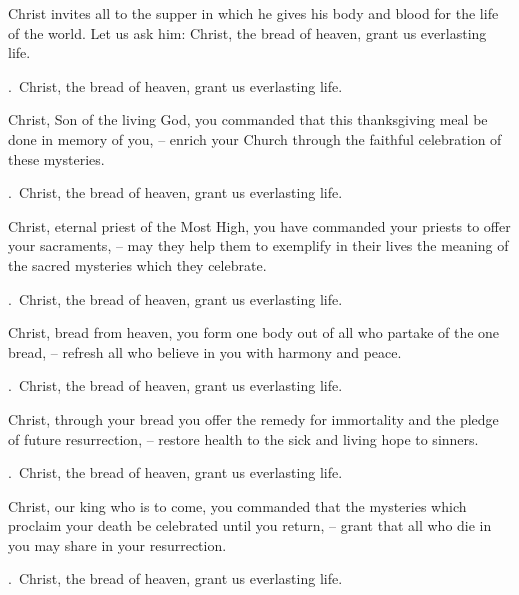 \lettrine[loversize=0.15,lines=2]{C}{}hrist invites all to the supper in which he gives his body and blood for the life of the world. Let us ask him: Christ, the bread of heaven, grant us everlasting life.
\par \Rbar.~Christ, the bread of heaven, grant us everlasting life.

Christ, Son of the living God, you commanded that this thanksgiving meal be done in memory of you,
– enrich your Church through the faithful celebration of these mysteries.
\par \Rbar.~Christ, the bread of heaven, grant us everlasting life.

Christ, eternal priest of the Most High, you have commanded your priests to offer your sacraments,
– may they help them to exemplify in their lives the meaning of the sacred mysteries which they celebrate.
\par \Rbar.~Christ, the bread of heaven, grant us everlasting life.

Christ, bread from heaven, you form one body out of all who partake of the one bread,
– refresh all who believe in you with harmony and peace.
\par \Rbar.~Christ, the bread of heaven, grant us everlasting life.

Christ, through your bread you offer the remedy for immortality and the pledge of future resurrection,
– restore health to the sick and living hope to sinners.
\par \Rbar.~Christ, the bread of heaven, grant us everlasting life.

Christ, our king who is to come, you commanded that the mysteries which proclaim your death be celebrated until you return,
– grant that all who die in you may share in your resurrection.
\par \Rbar.~Christ, the bread of heaven, grant us everlasting life.
